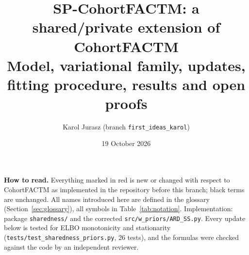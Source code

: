 \documentclass[11pt,a4paper]{article}
\title{SP-CohortFACTM: a shared/private extension of CohortFACTM\\[2pt]
\large Model, variational family, updates, fitting procedure, results and open proofs}
\author{Karol Jurasz \quad (branch \texttt{first\_ideas\_karol})}
\date{19 October 2026}
\newcommand{\new}[1]{{\color{red}#1}}
\theoremstyle{definition}
\theoremstyle{remark}
\begin{document}
\maketitle

\noindent\textbf{How to read.} Everything marked \new{in red} is new or changed with respect to CohortFACTM as
implemented in the repository before this branch; black terms are unchanged. All names introduced here are defined in
the glossary (Section~\ref{sec:glossary}), all symbols in Table~\ref{tab:notation}. Implementation: package
\texttt{sharedness/} and the corrected \texttt{src/w\_priors/ARD\_SS.py}. Every update below is tested for ELBO
monotonicity and stationarity (\texttt{tests/test\_sharedness\_priors.py}, 26 tests), and the formulas were checked
against the code by an independent reviewer.

\tableofcontents

\end{document}
